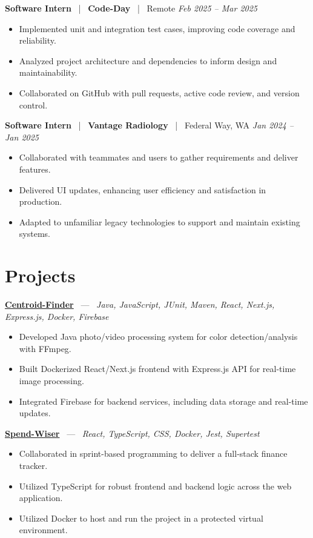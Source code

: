 \documentclass[10pt, letterpaper]{article}
\newcommand{\jobhead}[4]{%
  \vspace{5pt}%
  {\bfseries\color{dark}#1}%
  ~{\color{light}|}~%
  {\bfseries\color{navy}#2}%
  ~{\color{light}|}~%
  {\color{light}#3}%
  \hfill{\color{light}\small\textit{#4}}\\[-2pt]%
}
\newcommand{\projhead}[3]{%
  \vspace{5pt}%
  {\bfseries\color{dark}\href{#2}{#1}}%
  ~{\color{light}---}~%
  {\color{light}\small\textit{#3}}\\[-2pt]%
}
\begin{document}
\jobhead{Software Intern}{Code-Day}{Remote}{Feb 2025 – Mar 2025}
\begin{itemize}
  \item Implemented unit and integration test cases, improving code coverage and reliability.
  \item Analyzed project architecture and dependencies to inform design and maintainability.
  \item Collaborated on GitHub with pull requests, active code review, and version control.
\end{itemize}

\jobhead{Software Intern}{Vantage Radiology}{Federal Way, WA}{Jan 2024 – Jan 2025}
\begin{itemize}
  \item Collaborated with teammates and users to gather requirements and deliver features.
  \item Delivered UI updates, enhancing user efficiency and satisfaction in production.
  \item Adapted to unfamiliar legacy technologies to support and maintain existing systems.
\end{itemize}

\section{Projects}

\projhead{Centroid-Finder}{https://github.com/xavierb117/centroid-finder}{Java, JavaScript, JUnit, Maven, React, Next.js, Express.js, Docker, Firebase}
\begin{itemize}
  \item Developed Java photo/video processing system for color detection/analysis with FFmpeg.
  \item Built Dockerized React/Next.js frontend with Express.js API for real-time image processing.
  \item Integrated Firebase for backend services, including data storage and real-time updates.
\end{itemize}

\projhead{Spend-Wiser}{https://github.com/JesseChum/w26-sdev372-spendwiser-finance-tracker}{React, TypeScript, CSS, Docker, Jest, Supertest}
\begin{itemize}
  \item Collaborated in sprint-based programming to deliver a full-stack finance tracker.
  \item Utilized TypeScript for robust frontend and backend logic across the web application.
  \item Utilized Docker to host and run the project in a protected virtual environment.
\end{itemize}
\end{document}
